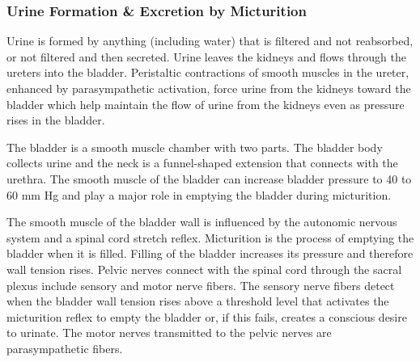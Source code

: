 
\subsubsection{Urine Formation \& Excretion by Micturition}

Urine is formed by anything (including water) that is filtered and not reabsorbed, or not filtered and then secreted. Urine leaves the kidneys and flows through the ureters into the bladder. Peristaltic contractions of smooth muscles in the ureter, enhanced by parasympathetic activation, force urine from the kidneys toward the bladder which help maintain the flow of urine from the kidneys even as pressure rises in the bladder. 

The bladder is a smooth muscle chamber with two parts. The bladder body collects urine and the neck is a funnel-shaped extension that connects with the urethra. The smooth muscle of the bladder can increase bladder pressure to 40 to 60 mm Hg and play a major role in emptying the bladder during micturition.

The smooth muscle of the bladder wall is influenced by the autonomic nervous system and a spinal cord stretch reflex. Micturition is the process of emptying the bladder when it is filled. Filling of the bladder increases its pressure and therefore wall tension rises. Pelvic nerves connect with the spinal cord through the sacral plexus include sensory and motor nerve fibers. The sensory nerve fibers detect when the bladder wall tension rises above a threshold level that activates the micturition reflex to empty the bladder or, if this fails, creates a conscious desire to urinate. The motor nerves transmitted to the pelvic nerves are parasympathetic fibers.

